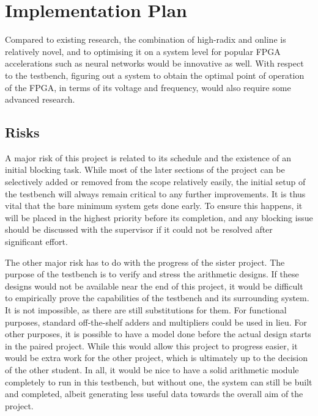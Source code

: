 \documentclass[journal]{IEEEtran}
\begin{document}

\section{Implementation Plan}

Compared to existing research, the combination of high-radix and online is relatively novel, and to optimising it on a system level for popular FPGA accelerations such as neural networks would be innovative as well. With respect to the testbench, figuring out a system to obtain the optimal point of operation of the FPGA, in terms of its voltage and frequency, would also require some advanced research.

\subsection{Risks}
A major risk of this project is related to its schedule and the existence of an initial blocking task. While most of the later sections of the project can be selectively added or removed from the scope relatively easily, the initial setup of the testbench will always remain critical to any further improvements. It is thus vital that the bare minimum system gets done early. To ensure this happens, it will be placed in the highest priority before its completion, and any blocking issue should be discussed with the supervisor if it could not be resolved after significant effort.

The other major risk has to do with the progress of the sister project. The purpose of the testbench is to verify and stress the arithmetic designs. If these designs would not be available near the end of this project, it would be difficult to empirically prove the capabilities of the testbench and its surrounding system. It is not impossible, as there are still substitutions for them. For functional purposes, standard off-the-shelf adders and multipliers could be used in lieu. For other purposes, it is possible to have a model done before the actual design starts in the paired project. While this would allow this project to progress easier, it would be extra work for the other project, which is ultimately up to the decision of the other student. In all, it would be nice to have a solid arithmetic module completely to run in this testbench, but without one, the system can still be built and completed, albeit generating less useful data towards the overall aim of the project.
\end{document}
